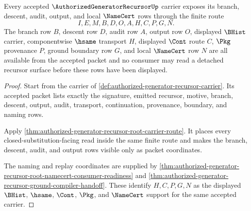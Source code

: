 \begin{theorem}
\label{thm:authorized-generator-recursor-acceptance-totality}
Every accepted $\AuthorizedGeneratorRecursorUp$ carrier exposes its branch, descent, audit, output, and local $\NameCert$ rows through the finite route
$$
I,E,M,B,D,O,A,H,C,P,G,N.
$$
The branch row $B$, descent row $D$, audit row $A$, output row $O$, displayed $\BHist$ carrier, componentwise $\hsame$ transport $H$, displayed $\Cont$ route $C$, $\Pkg$ provenance $P$, ground boundary row $G$, and local $\NameCert$ row $N$ are all available from the accepted packet and no consumer may read a detached recursor surface before these rows have been displayed.
\end{theorem}
\begin{proof}
Start from the carrier of \autoref{def:authorized-generator-recursor-carrier}. Its accepted packet lists exactly the signature, emitted recursor, motive, branch, descent, output, audit, transport, continuation, provenance, boundary, and naming rows.

Apply \autoref{thm:authorized-generator-recursor-root-carrier-route}. It places every closed-substitution-facing read inside the same finite route and makes the branch, descent, audit, and output rows visible only as packet coordinates.

The naming and replay coordinates are supplied by \autoref{thm:authorized-generator-recursor-root-namecert-consumer-readiness} and \autoref{thm:authorized-generator-recursor-ground-compiler-handoff}. These identify $H,C,P,G,N$ as the displayed $\BHist$, $\hsame$, $\Cont$, $\Pkg$, and $\NameCert$ support for the same accepted carrier.
\end{proof}

